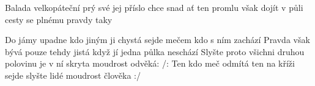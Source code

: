 \begin{TEXT}{Balada velkopáteční}
\SLOKA {}  prý  své \NL
{} jej  příslo\NL
{} chce  snad  \NL
{} ať ten  promlu\NL
{} však  dojít \NL
{} v půli cesty \NL
{} se   plnému \NL
{} pravdy  taky 

\SLOKA Do jámy upadne kdo jiným ji chystá\NL
sejde mečem kdo s ním zachází\NL
Pravda však bývá pouze tehdy jistá\NL
když jí jedna půlka neschází\NL
Slyšte proto všichni druhou polovinu\NL
je v ní skryta moudrost odvěká:\NL
/: Ten kdo meč odmítá ten na kříži sejde\NL
slyšte lidé moudrost člověka :/
\end{TEXT}